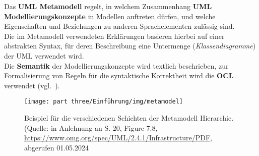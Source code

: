 \vspace{2mm}
\begin{tcolorbox}
    Das \textbf{UML Metamodell} regelt, in welchem Zusammenhang \textbf{UML Modellierungskonzepte} in Modellen auftreten dürfen, und welche Eigenschaften und Beziehungen zu anderen Sprachelementen zulässig sind.\\
    Die im Metamodell verwendeten Erklärungen basieren hierbei auf einer abstrakten Syntax, für deren Beschreibung eine Untermenge (\textit{Klassendiagramme}) der UML verwendet wird.\\
    Die \textbf{Semantik} der Modellierungskonzepte wird textlich beschrieben, zur Formalisierung von Regeln für die syntaktische Korrektheit wird die \textbf{OCL} verwendet (vgl.~\cite[82]{Buh09}).
\end{tcolorbox}
\vspace{2mm}

\begin{figure}
    \centering
    \texttt{[image: part three/Einführung/img/metamodel]}
    \caption{Beispiel für die verschiedenen Schichten der Metamodell Hierarchie. (Quelle: in Anlehnung an S. 20, Figure 7.8, \url{https://www.omg.org/spec/UML/2.4.1/Infrastructure/PDF}, abgerufen 01.05.2024}
    \label{fig:metamodel}
\end{figure}

